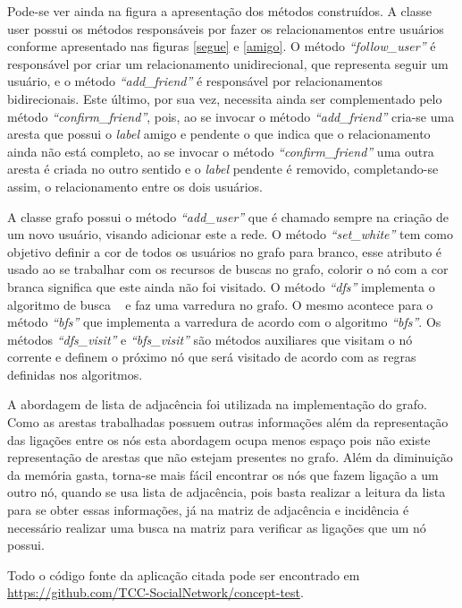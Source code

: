 Pode-se ver ainda na figura a apresentação dos métodos construídos. A classe user possui os métodos responsáveis por fazer os relacionamentos entre usuários conforme apresentado nas figuras \ref{segue} e \ref{amigo}. O método \textit{``follow\_user''} é responsável por criar um relacionamento unidirecional, que representa seguir um usuário, e o método \textit{``add\_friend''} é responsável por relacionamentos bidirecionais. Este último, por sua vez, necessita ainda ser complementado pelo método \textit{``confirm\_friend''}, pois, ao se invocar o método \textit{``add\_friend''} cria-se uma aresta que possui o \textit{label} amigo e pendente o que indica que o relacionamento ainda não está completo, ao se invocar o método \textit{``confirm\_friend''} uma outra aresta é criada no outro sentido e o \textit{label} pendente é removido, completando-se assim, o relacionamento entre os dois usuários.

A classe grafo possui o método \textit{``add\_user''} que é chamado sempre na criação de um novo usuário, visando adicionar este a rede. O método \textit{``set\_white''} tem como objetivo definir a cor de todos os usuários no grafo para branco, esse atributo é usado ao se trabalhar com os recursos de buscas no grafo, colorir o nó com a cor branca significa que este ainda não foi visitado. O método \textit{``dfs''} implementa o algoritmo de busca ~ e faz uma varredura no grafo. O mesmo acontece para o método \textit{``bfs''} que implementa a varredura de acordo com o algoritmo \textit{``bfs''}. Os métodos \textit{``dfs\_visit''} e \textit{``bfs\_visit''} são métodos auxiliares que visitam o nó corrente e definem o próximo nó que será visitado de acordo com as regras definidas nos algoritmos.

A abordagem de lista de adjacência foi utilizada na implementação do grafo. Como as arestas trabalhadas possuem outras informações além da representação das ligações entre os nós esta abordagem ocupa menos espaço pois não existe representação de arestas que não estejam presentes no grafo. Além da diminuição da memória gasta, torna-se mais fácil encontrar os nós que fazem ligação a um outro nó, quando se usa lista de adjacência, pois basta realizar a leitura da lista para se obter essas informações, já na matriz de adjacência e incidência é necessário realizar uma busca na matriz para verificar as ligações que um nó possui.

Todo o código fonte da aplicação citada pode ser encontrado em \url{https://github.com/TCC-SocialNetwork/concept-test}.

